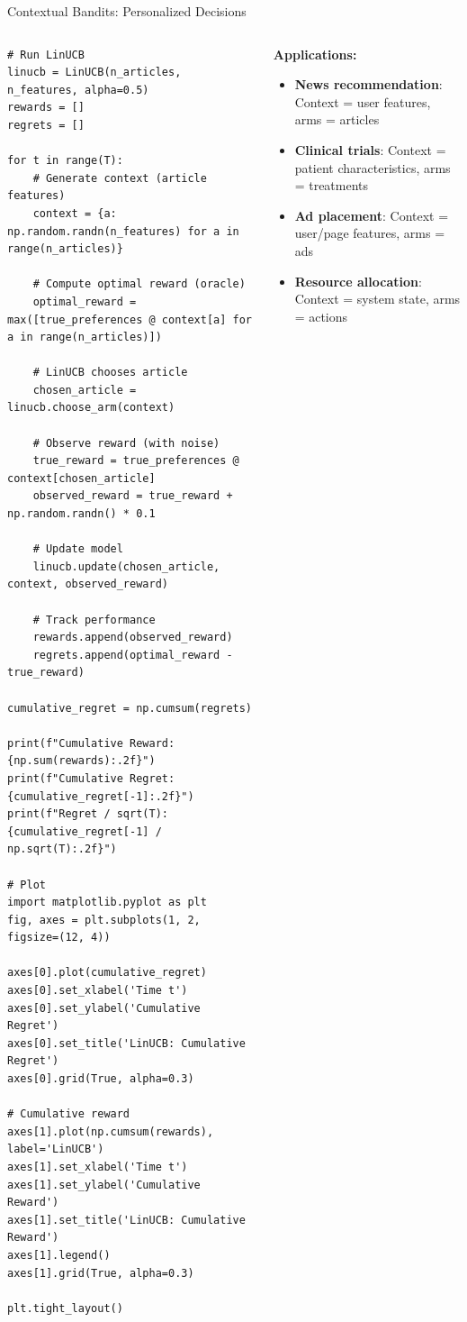 \begin{frame}[fragile]{Contextual Bandits: Personalized Decisions}
\begin{columns}
\begin{column}{0.55\textwidth}
\begin{lstlisting}[basicstyle=\ttfamily\tiny]
# Run LinUCB
linucb = LinUCB(n_articles, n_features, alpha=0.5)
rewards = []
regrets = []

for t in range(T):
    # Generate context (article features)
    context = {a: np.random.randn(n_features) for a in range(n_articles)}

    # Compute optimal reward (oracle)
    optimal_reward = max([true_preferences @ context[a] for a in range(n_articles)])

    # LinUCB chooses article
    chosen_article = linucb.choose_arm(context)

    # Observe reward (with noise)
    true_reward = true_preferences @ context[chosen_article]
    observed_reward = true_reward + np.random.randn() * 0.1

    # Update model
    linucb.update(chosen_article, context, observed_reward)

    # Track performance
    rewards.append(observed_reward)
    regrets.append(optimal_reward - true_reward)

cumulative_regret = np.cumsum(regrets)

print(f"Cumulative Reward: {np.sum(rewards):.2f}")
print(f"Cumulative Regret: {cumulative_regret[-1]:.2f}")
print(f"Regret / sqrt(T): {cumulative_regret[-1] / np.sqrt(T):.2f}")

# Plot
import matplotlib.pyplot as plt
fig, axes = plt.subplots(1, 2, figsize=(12, 4))

axes[0].plot(cumulative_regret)
axes[0].set_xlabel('Time t')
axes[0].set_ylabel('Cumulative Regret')
axes[0].set_title('LinUCB: Cumulative Regret')
axes[0].grid(True, alpha=0.3)

# Cumulative reward
axes[1].plot(np.cumsum(rewards), label='LinUCB')
axes[1].set_xlabel('Time t')
axes[1].set_ylabel('Cumulative Reward')
axes[1].set_title('LinUCB: Cumulative Reward')
axes[1].legend()
axes[1].grid(True, alpha=0.3)

plt.tight_layout()
\end{lstlisting}
\end{column}
\begin{column}{0.45\textwidth}
\textbf{Applications:}
\begin{itemize}
\item \textbf{News recommendation}: Context = user features, arms = articles
\item \textbf{Clinical trials}: Context = patient characteristics, arms = treatments
\item \textbf{Ad placement}: Context = user/page features, arms = ads
\item \textbf{Resource allocation}: Context = system state, arms = actions
\end{itemize}


\end{column}
\end{columns}
\end{frame}
